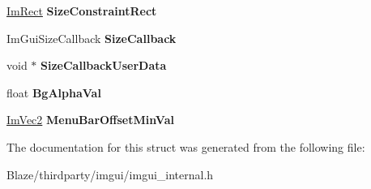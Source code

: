 \begin{DoxyCompactItemize}
\hyperlink{structImRect}{Im\+Rect} {\bfseries Size\+Constraint\+Rect}
\item 
\mbox{\label{structImGuiNextWindowData_acab3905da227922b52f03943b355b27a}} 
Im\+Gui\+Size\+Callback {\bfseries Size\+Callback}
\item 
\mbox{\label{structImGuiNextWindowData_a3b80639b573e9a009da8aa9f9ca1a250}} 
void $\ast$ {\bfseries Size\+Callback\+User\+Data}
\item 
\mbox{\label{structImGuiNextWindowData_a3597005fb1cdd4d3fa06296bbbb5a2c2}} 
float {\bfseries Bg\+Alpha\+Val}
\item 
\mbox{\label{structImGuiNextWindowData_ab2b226f215bfdf2639f620e6d84157f6}} 
\hyperlink{structImVec2}{Im\+Vec2} {\bfseries Menu\+Bar\+Offset\+Min\+Val}
\end{DoxyCompactItemize}


The documentation for this struct was generated from the following file\+:\begin{DoxyCompactItemize}
\item 
Blaze/thirdparty/imgui/imgui\+\_\+internal.\+h\end{DoxyCompactItemize}
